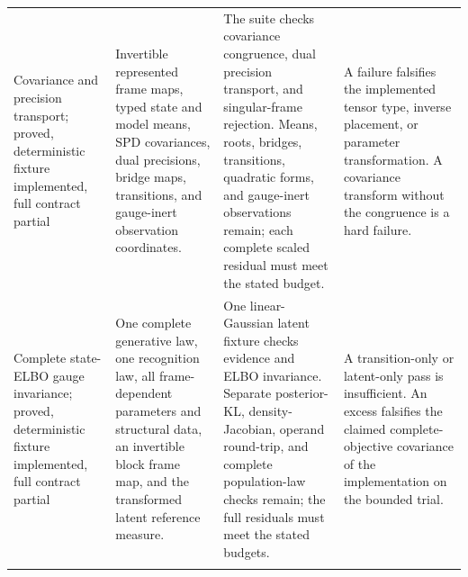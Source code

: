 \begin{longtable}{>{\raggedright\arraybackslash}p{}>{\raggedright\arraybackslash}p{}>{\raggedright\arraybackslash}p{}>{\raggedright\arraybackslash}p{}}
\addlinespace
Covariance and precision transport; proved, deterministic fixture implemented, full contract partial & Invertible represented frame maps, typed state and model means, SPD covariances, dual precisions, bridge maps, transitions, and gauge-inert observation coordinates. & The suite checks covariance congruence, dual precision transport, and singular-frame rejection. Means, roots, bridges, transitions, quadratic forms, and gauge-inert observations remain; each complete scaled residual must meet the stated budget. & A failure falsifies the implemented tensor type, inverse placement, or parameter transformation. A covariance transform without the congruence is a hard failure. \\
\addlinespace
Complete state-ELBO gauge invariance; proved, deterministic fixture implemented, full contract partial & One complete generative law, one recognition law, all frame-dependent parameters and structural data, an invertible block frame map, and the transformed latent reference measure. & One linear-Gaussian latent fixture checks evidence and ELBO invariance. Separate posterior-KL, density-Jacobian, operand round-trip, and complete population-law checks remain; the full residuals must meet the stated budgets. & A transition-only or latent-only pass is insufficient. An excess falsifies the claimed complete-objective covariance of the implementation on the bounded trial. \\
\addlinespace

\end{longtable}
